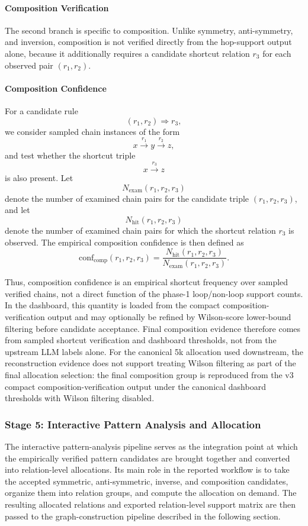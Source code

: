 \documentclass[12pt,a4paper]{article}
\begin{document}
\paragraph{Composition Verification} 
The second branch is specific to composition. Unlike symmetry, anti-symmetry, and inversion, composition is not verified directly from the hop-support output alone, because it additionally requires a candidate shortcut relation $r_3$ for each observed pair $(r_1,r_2)$.

\paragraph{Composition Confidence} 
For a candidate rule
\[
(r_1,r_2) \Rightarrow r_3,
\]
we consider sampled chain instances of the form
\[
x \xrightarrow{r_1} y \xrightarrow{r_2} z,
\]
and test whether the shortcut triple
\[
x \xrightarrow{r_3} z
\]
is also present. 
Let
\[
N_{\mathrm{exam}}(r_1,r_2,r_3)
\]
denote the number of examined chain pairs for the candidate triple $(r_1,r_2,r_3)$, and let
\[
N_{\mathrm{hit}}(r_1,r_2,r_3)
\]
denote the number of examined chain pairs for which the shortcut relation $r_3$ is observed. The empirical composition confidence is then defined as
\[
\mathrm{conf}_{\mathrm{comp}}(r_1,r_2,r_3)
=
\frac{N_{\mathrm{hit}}(r_1,r_2,r_3)}
{N_{\mathrm{exam}}(r_1,r_2,r_3)}.
\]

Thus, composition confidence is an empirical shortcut frequency over sampled verified chains, not a direct function of the phase-1 loop/non-loop support counts. In the dashboard, this quantity is loaded from the compact composition-verification output and may optionally be refined by Wilson-score lower-bound filtering before candidate acceptance. Final composition evidence therefore comes from sampled shortcut verification and dashboard thresholds, not from the upstream LLM labels alone. For the canonical 5k allocation used downstream, the reconstruction evidence does not support treating Wilson filtering as part of the final allocation selection: the final composition group is reproduced from the v3 compact composition-verification output under the canonical dashboard thresholds with Wilson filtering disabled.



\subsubsection{Stage 5: Interactive Pattern Analysis and Allocation}


The interactive pattern-analysis pipeline serves as the integration point at which the empirically verified pattern candidates are brought together and converted into relation-level allocations. Its main role in the reported workflow is to take the accepted symmetric, anti-symmetric, inverse, and composition candidates, organize them into relation groups, and compute the allocation on demand. The resulting allocated relations and exported relation-level support matrix are then passed to the graph-construction pipeline described in the following section.
\end{document}
